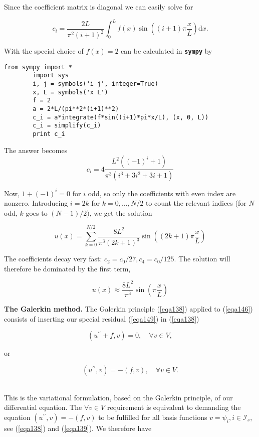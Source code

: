 \documentclass[../main.tex]{subfiles}
\begin{document}
	\noindent Since the coefficient matrix is diagonal we can easily solve for
	
	\begin{equation}
		\label{eqa155}
		c_{i}=\frac{2 L}{\pi^{2}(i+1)^{2}} \int_{0}^{L} f(x) \sin \left((i+1) \pi \frac{x}{L}\right) 	\mathrm{d} x .
	\end{equation}

	\noindent With the special choice of $f(x)=2$ can be calculated in \textbf{\texttt{sympy}} by
	
	\begin{lstlisting}[numbers=none]
		from sympy import *
		import sys
		i, j = symbols('i j', integer=True)
		x, L = symbols('x L')
		f = 2
		a = 2*L/(pi**2*(i+1)**2)
		c_i = a*integrate(f*sin((i+1)*pi*x/L), (x, 0, L))
		c_i = simplify(c_i)
		print c_i
	\end{lstlisting}
	
	\noindent The answer becomes
	$$ c_{i}=4 \frac{L^{2}\left((-1)^{i}+1\right)}{\pi^{3}\left(i^{3}+3 i^{2}+3 i+1\right)}$$
	
	\noindent Now, $1+(-1)^{i}=0$ for $i$ odd, so only the coefficients with even index are nonzero. Introducing $i=2 k$ for $k=0, \ldots, N / 2$ to count the relevant indices (for $N$ odd, $k$ goes to $(N-1) / 2)$, we get the solution 

	\begin{equation}
		\label{eqa156}
		u(x)=\sum_{k=0}^{N / 2} \frac{8 L^{2}}{\pi^{3}(2 k+1)^{3}} \sin \left((2 k+1) \pi 	\frac{x}{L}\right)
	\end{equation}

	\noindent The coefficients decay very fast: $c_{2}=c_{0} / 27, c_{4}=c_{0} / 125$. The solution will therefore be dominated by the first term,

	$$ u(x) \approx \frac{8 L^{2}}{\pi^{3}} \sin \left(\pi \frac{x}{L}\right) $$

	\noindent\textbf{The Galerkin method.   } The Galerkin principle (\ref{eqa138}) applied to (\ref{eqa146}) consists of inserting our special residual (\ref{eqa149}) in (\ref{eqa138})

	$$ \left(u^{\prime \prime}+f, v\right)=0, \quad \forall v \in V, $$
	
	\noindent or
	
	\begin{equation}
		\label{eqa157}
		\left(u^{\prime \prime}, v\right)=-(f, v), \quad \forall v \in V .
	\end{equation}\

	\noindent This is the variational formulation, based on the Galerkin principle, of our differential equation. The $\forall v \in V$ requirement is equivalent to demanding the equation $\left(u^{\prime \prime}, v\right)=-(f, v)$ to be fulfilled for all basis functions $v=\psi_{i}, i \in \mathcal{I}_{s}$, see (\ref{eqa138}) and (\ref{eqa139}). We therefore have
	
\end{document}
